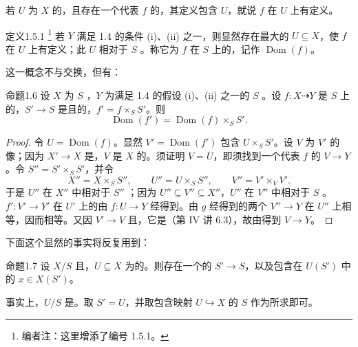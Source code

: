 若 $U$ 为 $X$ 的，且存在一个代表 $f$ 的，其定义包含 $U$，就说 $f$ 在 $U$ 上有定义。
\begin{SGAresult}{定义}{1.5.1}
\footnote{编者注：这里增添了编号 1.5.1。} 若 $Y$ 满足 1.4 的条件 (i)、(ii) 之一，则显然存在最大的 $U\subseteq X$，使 $f$ 在 $U$ 上有定义；此 $U$ 相对于 $S$ 。称它为 $f$ 在 $S$ 上的，记作 $\operatorname{Dom}(f)$。
\end{SGAresult}
这一概念不与交换，但有：
\begin{SGAresult}{命题}{1.6}
设 $X$ 为 $S$ ，$Y$ 为满足 1.4 的假设 (i)、(ii) 之一的 $S$ 。设 $f:X\dashrightarrow Y$ 是 $S$ 上的，$S'\to S$ 是且的，$f'=f\times_S S'$。则
\[
\operatorname{Dom}(f')=\operatorname{Dom}(f)\times_S S'.
\]
\end{SGAresult}
\begin{proof}
令 $U=\operatorname{Dom}(f)$。显然 $V'=\operatorname{Dom}(f')$ 包含 $U\times_S S'$。设 $V$ 为 $V'$ 的像；因为 $X'\to X$ 是，$V$ 是 $X$ 的。须证明 $V=U$，即须找到一个代表 $f$ 的 $V\to Y$。令 $S''=S'\times_S S'$，并令
\[
X''=X\times_S S'',\qquad U''=U\times_S S'',\qquad V''=V'\times_V V'.
\]
于是 $U''$ 在 $X''$ 中相对于 $S''$ ；因为 $U''\subseteq V''\subseteq X''$，$U''$ 在 $V''$ 中相对于 $S$ 。$f':V'\to Y'$ 在 $U'$ 上的由 $f:U\to Y$ 经得到。由 $g$ 经得到的两个 $V''\to Y$ 在 $U''$ 上相等，因而相等。又因 $V'\to V$ 且，它是（第 IV 讲 6.3），故由得到 $V\to Y$。
\end{proof}
下面这个显然的事实将反复用到：
\begin{SGAresult}{命题}{1.7}
设 $X/S$ 且，$U\subseteq X$ 为的。则存在一个的 $S'\to S$，以及包含在 $U(S')$ 中的 $x\in X(S')$。
\end{SGAresult}
事实上，$U/S$ 是。取 $S'=U$，并取包含映射 $U\hookrightarrow X$ 的 $S$ 作为所求即可。

